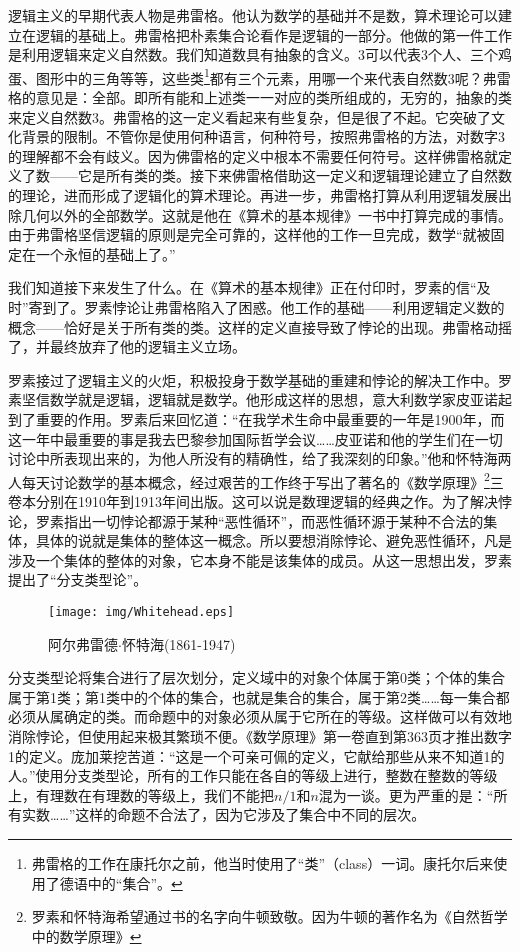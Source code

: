 \documentclass{article}
\begin{document}
逻辑主义的早期代表人物是弗雷格。他认为数学的基础并不是数，算术理论可以建立在逻辑的基础上。弗雷格把朴素集合论看作是逻辑的一部分。他做的第一件工作是利用逻辑来定义自然数。我们知道数具有抽象的含义。3可以代表3个人、三个鸡蛋、图形中的三角等等，这些类\footnote{弗雷格的工作在康托尔之前，他当时使用了“类”（class）一词。康托尔后来使用了德语中的“集合”。}都有三个元素，用哪一个来代表自然数3呢？弗雷格的意见是：全部。即所有能和上述类一一对应的类所组成的，无穷的，抽象的类来定义自然数3。弗雷格的这一定义看起来有些复杂，但是很了不起。它突破了文化背景的限制。不管你是使用何种语言，何种符号，按照弗雷格的方法，对数字3的理解都不会有歧义。因为佛雷格的定义中根本不需要任何符号。这样佛雷格就定义了数——它是所有类的类。接下来佛雷格借助这一定义和逻辑理论建立了自然数的理论，进而形成了逻辑化的算术理论。再进一步，弗雷格打算从利用逻辑发展出除几何以外的全部数学。这就是他在《算术的基本规律》一书中打算完成的事情。由于弗雷格坚信逻辑的原则是完全可靠的，这样他的工作一旦完成，数学“就被固定在一个永恒的基础上了。”

我们知道接下来发生了什么。在《算术的基本规律》正在付印时，罗素的信“及时”寄到了。罗素悖论让弗雷格陷入了困惑。他工作的基础——利用逻辑定义数的概念——恰好是关于所有类的类。这样的定义直接导致了悖论的出现。弗雷格动摇了，并最终放弃了他的逻辑主义立场。

罗素接过了逻辑主义的火炬，积极投身于数学基础的重建和悖论的解决工作中。罗素坚信数学就是逻辑，逻辑就是数学。他形成这样的思想，意大利数学家皮亚诺起到了重要的作用。罗素后来回忆道：“在我学术生命中最重要的一年是1900年，而这一年中最重要的事是我去巴黎参加国际哲学会议……皮亚诺和他的学生们在一切讨论中所表现出来的，为他人所没有的精确性，给了我深刻的印象。”他和怀特海两人每天讨论数学的基本概念，经过艰苦的工作终于写出了著名的《数学原理》\footnote{罗素和怀特海希望通过书的名字向牛顿致敬。因为牛顿的著作名为《自然哲学中的数学原理》}三卷本分别在1910年到1913年间出版。这可以说是数理逻辑的经典之作。为了解决悖论，罗素指出一切悖论都源于某种“恶性循环”，而恶性循环源于某种不合法的集体，具体的说就是集体的整体这一概念。所以要想消除悖论、避免恶性循环，凡是涉及一个集体的整体的对象，它本身不能是该集体的成员。从这一思想出发，罗素提出了“分支类型论”。

\begin{wrapfigure}{R}{0.4\textwidth}
 \centering
 \texttt{[image: img/Whitehead.eps]}
 \captionsetup{labelformat=empty}
 \caption{阿尔弗雷德$\cdot$怀特海(1861-1947)}
 \label{fig:Whitehead}
\end{wrapfigure}

分支类型论将集合进行了层次划分，定义域中的对象个体属于第0类；个体的集合属于第1类；第1类中的个体的集合，也就是集合的集合，属于第2类……每一集合都必须从属确定的类。而命题中的对象必须从属于它所在的等级。这样做可以有效地消除悖论，但使用起来极其繁琐不便。《数学原理》第一卷直到第363页才推出数字1的定义。庞加莱挖苦道：“这是一个可亲可佩的定义，它献给那些从来不知道1的人。”使用分支类型论，所有的工作只能在各自的等级上进行，整数在整数的等级上，有理数在有理数的等级上，我们不能把$n/1$和$n$混为一谈。更为严重的是：“所有实数……”这样的命题不合法了，因为它涉及了集合中不同的层次。
\end{document}
